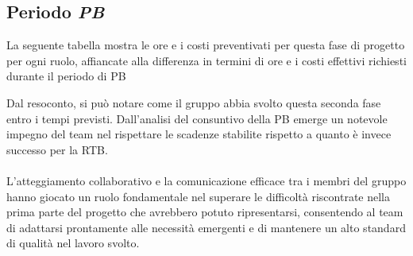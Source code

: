 \documentclass[5pt]{article}
\begin{document}
  \subsection{Periodo \textit{PB}}
La seguente tabella mostra le ore e i costi preventivati per questa fase di progetto per ogni ruolo, affiancate
alla differenza in termini di ore e i costi effettivi richiesti durante il periodo di PB
    \begin{table}[H]
      \centering
      \caption{Resoconto ore e costi \textit{PB}}
    \end{table}
    Dal resoconto, si può notare come il gruppo abbia svolto questa seconda fase entro i tempi previsti.
    Dall'analisi del consuntivo della PB emerge un notevole impegno del team nel rispettare le scadenze stabilite rispetto a quanto è invece successo per la RTB. \\\\
    L'atteggiamento collaborativo e la comunicazione efficace tra i membri del gruppo hanno giocato un ruolo fondamentale nel superare le difficoltà riscontrate nella prima parte del progetto che avrebbero potuto ripresentarsi, consentendo al team di adattarsi prontamente alle necessità emergenti e di mantenere un alto standard di qualità nel lavoro svolto.
    
\end{document}
